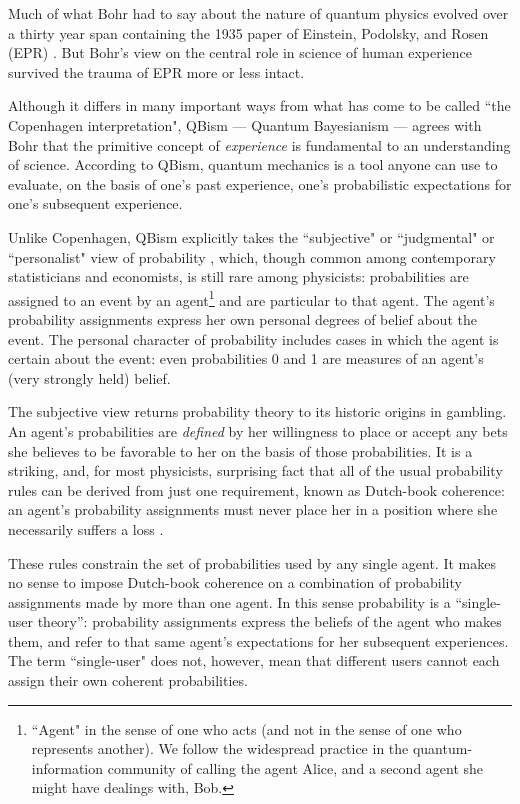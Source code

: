 \documentclass[aps,prb,superscriptaddress,12pt,tightenlines,nofootinbib]{revtex4-2}
\begin{document}

Much of what Bohr had to say about the nature of quantum physics evolved over a
thirty year span containing the 1935 paper of Einstein, Podolsky, and Rosen
(EPR) \cite{Einstein35}.   But Bohr's view on the central role in science of human experience
survived the trauma of EPR more or less intact.

Although it differs in many important ways from what has come to be called ``the Copenhagen interpretation", QBism \cite{Fuchs10} --- Quantum Bayesianism  ---  agrees with Bohr
that the primitive concept of  {\it experience} is fundamental to an understanding of science.   According to
QBism, quantum mechanics is a tool anyone can use to evaluate, on the basis of one's past experience, one's probabilistic expectations for one's subsequent  experience.

Unlike Copenhagen, QBism explicitly takes the ``subjective" or  ``judgmental"
or ``personalist" view of probability \cite{Savage54,deFinetti90,Bernardo94,Jeffrey04,Lindley06},
which, though common among contemporary  statisticians and eco\-nom\-ists, is still rare among physicists:  probabilities are assigned to an event by an agent\footnote{``Agent" in the sense of one who acts (and not in the sense of one who represents another).  We follow the widespread practice in the quantum-information community of calling the agent Alice, and a second agent she might have dealings with, Bob.} and are particular to that agent.   The agent's probability assignments express her own personal degrees of belief about the event.    The personal character of probability  includes cases in which the agent is certain about the event:  even probabilities 0 and 1 are measures of an agent's (very strongly held) belief.

The subjective view returns probability theory to its historic origins in gambling.   An agent's probabilities are {\it defined} by her  willingness to
place or accept any bets she believes to be favorable to her on the basis of those probabilities.
It is a striking, and, for most physicists, surprising fact that all of the
usual probability rules can be derived from just one requirement, known as
Dutch-book coherence: an agent's probability assignments must never place her
in a position where she necessarily suffers a loss \cite{deFinetti90,Fuchs13}.

These rules constrain the set of probabilities used by any single agent.   It makes no sense to impose Dutch-book coherence on a combination of probability assignments made by more than one agent.   In this  sense probability is a ``single-user theory'':     probability assignments express the beliefs of the agent who makes them, and refer to that same agent's expectations for her subsequent experiences.   The term ``single-user" does not, however,  mean that  different users cannot each assign their own coherent probabilities.
\end{document}

